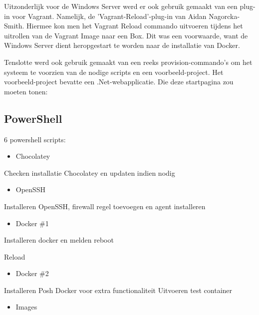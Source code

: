 
Uitzonderlijk voor de Windows Server werd er ook gebruik gemaakt van een plug-in voor Vagrant. Namelijk, de 'Vagrant-Reload'-plug-in van Aidan Nagorcka-Smith. Hiermee kon men het Vagrant Reload commando uitvoeren tijdens het uitrollen van de Vagrant Image naar een Box. Dit was een voorwaarde, want de Windows Server dient heropgestart te worden naar de installatie van Docker.


Tenslotte werd ook gebruik gemaakt van een reeks provision-commando's om het systeem te voorzien van de nodige scripts en een voorbeeld-project. Het voorbeeld-project bevatte een .Net-webapplicatie. Die deze startpagina zou moeten tonen:


\subsection{PowerShell}
6 powershell scripts:

\begin{itemize}[noitemsep]
	\item Chocolatey
\end{itemize}

Checken installatie Chocolatey en updaten indien nodig

\begin{itemize}[noitemsep]
	\item OpenSSH
\end{itemize}

Installeren OpenSSH, firewall regel toevoegen en agent installeren

\begin{itemize}[noitemsep]
	\item Docker \#1
\end{itemize}

Installeren docker en melden reboot

Reload

\begin{itemize}[noitemsep]
	\item Docker \#2
\end{itemize}

Installeren Posh Docker voor extra functionaliteit
Uitvoeren test container

\begin{itemize}[noitemsep]
	\item Images
\end{itemize}

